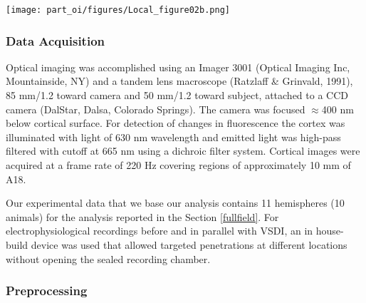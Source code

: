\begin{SCfigure}[50][!t]
\texttt{[image: part\_oi/figures/Local\_figure02b.png]}

\caption[Retinotopical
Mapping.]{\protect}

\label{loc_retinotopic} 

\end{SCfigure} 


\subsubsection{Data Acquisition}

Optical imaging was accomplished using an Imager 3001 (Optical Imaging Inc,
Mountainside, NY) and a tandem lens macroscope (Ratzlaff \& Grinvald, 1991),
85 mm/1.2 toward camera and 50 mm/1.2 toward subject, attached to a CCD
camera (DalStar, Dalsa, Colorado Springs). The camera was focused
$\approx$400 nm below cortical surface. For detection of changes in
fluorescence the cortex was illuminated with light of 630 nm
wavelength and emitted light was high-pass filtered with cutoff at 665 nm
using a dichroic filter system. Cortical images were acquired at a frame
rate of 220 Hz covering regions of approximately 10 mm of A18. 

Our experimental data that we base our analysis contains 11 hemispheres (10
animals) for the analysis reported in the Section \ref{fullfield}. For
electrophysiological recordings before and in parallel with VSDI, an in
house-build device was used that allowed targeted penetrations at different
locations without opening the sealed recording chamber.

\subsubsection{Preprocessing}

